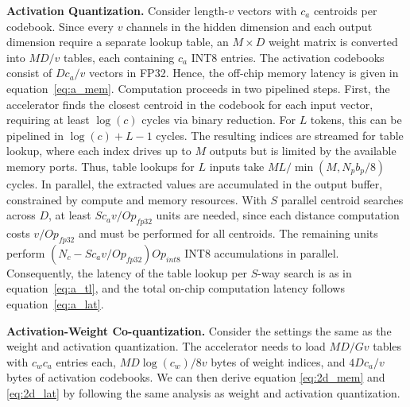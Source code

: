 \documentclass[conference]{IEEEtran}
\begin{document}
\noindent \textbf{Activation Quantization.} Consider length-$v$ vectors with $c_a$ centroids per codebook. Since every $v$ channels in the hidden dimension and each output dimension require a separate lookup table, an $M \times D$ weight matrix is converted into $MD/v$ tables, each containing $c_a$ INT8 entries. The activation codebooks consist of $Dc_a/v$ vectors in FP32. Hence, the off-chip memory latency is given in equation~\ref{eq:a_mem}. Computation proceeds in two pipelined steps. First, the accelerator finds the closest centroid in the codebook for each input vector, requiring at least $\log(c)$ cycles via binary reduction. For $L$ tokens, this can be pipelined in $\log(c)+L-1$ cycles. The resulting indices are streamed for table lookup, where each index drives up to $M$ outputs but is limited by the available memory ports. Thus, table lookups for $L$ inputs take $ML/\min(M, N_{p}b_{p}/8)$ cycles. In parallel, the extracted values are accumulated in the output buffer, constrained by compute and memory resources. With $S$ parallel centroid searches across $D$, at least $Sc_av/Op_{fp32}$ units are needed, since each distance computation costs $v/Op_{fp32}$ and must be performed for all centroids. The remaining units perform $(N_{c}-Sc_av/Op_{fp32})Op_{int8}$ INT8 accumulations in parallel. Consequently, the latency of the table lookup per $S$-way search is as in equation~\ref{eq:a_tl}, and the total on-chip computation latency follows equation~\ref{eq:a_lat}.

\noindent \textbf{Activation-Weight Co-quantization.} Consider the settings the same as the weight and activation quantization. The accelerator needs to load $MD/Gv$ tables with $c_wc_a$ entries each, $MD\log(c_w)/8v$ bytes of weight indices, and $4Dc_a/v$ bytes of activation codebooks. We can then derive equation \ref{eq:2d_mem} and \ref{eq:2d_lat} by following the same analysis as weight and activation quantization.







%
%
%






\end{document}
